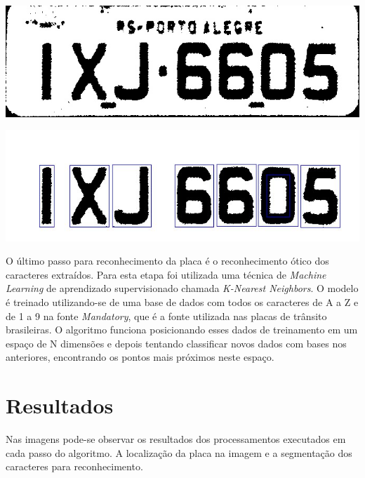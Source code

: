 \documentclass[a0,portrait]{a0poster}
\begin{document}
\begin{multicols}{2}
\begin{center}
	\includegraphics[width=0.70\linewidth]{a02fill_binary.jpg}
	\label{fig:plate_filled}
\end{center}

\begin{center}
	\includegraphics[width=0.70\linewidth]{character_segmentation.jpg}
	\label{fig:character_segmentation}
\end{center}

O último passo para reconhecimento da placa é o reconhecimento ótico dos
caracteres extraídos. Para esta etapa foi utilizada uma técnica de \emph{Machine Learning}
de aprendizado supervisionado chamada \emph{K-Nearest Neighbors}.
O modelo é treinado utilizando-se de uma base de dados com todos os caracteres
de A a Z e de 1 a 9 na fonte \emph{Mandatory}, que é a fonte utilizada nas placas de
trânsito brasileiras. O algoritmo funciona posicionando esses dados de treinamento
em um espaço de N dimensões e depois tentando classificar novos dados com bases nos anteriores,
encontrando os pontos mais próximos neste espaço.

\color{NavyBlue}
\section*{\huge Resultados}
\color{Black}

Nas imagens pode-se observar os resultados dos processamentos executados em cada 
passo do algoritmo. A localização da placa na imagem e a segmentação
dos caracteres para reconhecimento.


% 
% 

\end{multicols}

\end{document}
